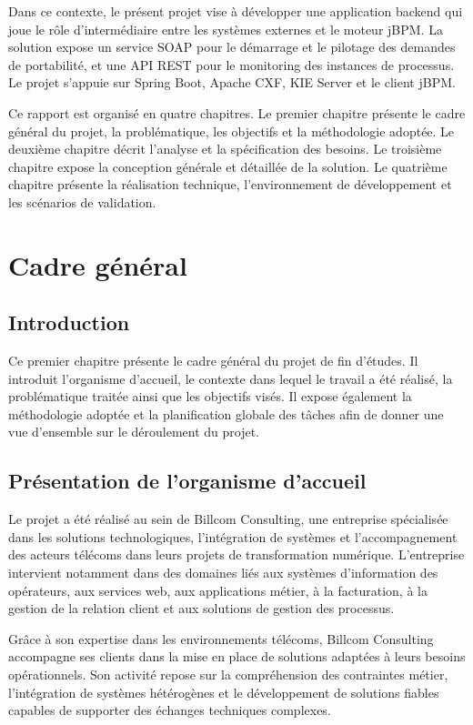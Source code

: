 \documentclass[12pt,a4paper]{report}
\begin{document}
Dans ce contexte, le présent projet vise à développer une application backend qui joue le rôle d'intermédiaire entre les systèmes externes et le moteur jBPM. La solution expose un service SOAP pour le démarrage et le pilotage des demandes de portabilité, et une API REST pour le monitoring des instances de processus. Le projet s'appuie sur Spring Boot, Apache CXF, KIE Server et le client jBPM.

Ce rapport est organisé en quatre chapitres. Le premier chapitre présente le cadre général du projet, la problématique, les objectifs et la méthodologie adoptée. Le deuxième chapitre décrit l'analyse et la spécification des besoins. Le troisième chapitre expose la conception générale et détaillée de la solution. Le quatrième chapitre présente la réalisation technique, l'environnement de développement et les scénarios de validation.

\chapter{Cadre général}
\section*{Introduction}
Ce premier chapitre présente le cadre général du projet de fin d'études. Il introduit l'organisme d'accueil, le contexte dans lequel le travail a été réalisé, la problématique traitée ainsi que les objectifs visés. Il expose également la méthodologie adoptée et la planification globale des tâches afin de donner une vue d'ensemble sur le déroulement du projet.

\section{Présentation de l'organisme d'accueil}
Le projet a été réalisé au sein de Billcom Consulting, une entreprise spécialisée dans les solutions technologiques, l'intégration de systèmes et l'accompagnement des acteurs télécoms dans leurs projets de transformation numérique. L'entreprise intervient notamment dans des domaines liés aux systèmes d'information des opérateurs, aux services web, aux applications métier, à la facturation, à la gestion de la relation client et aux solutions de gestion des processus.

Grâce à son expertise dans les environnements télécoms, Billcom Consulting accompagne ses clients dans la mise en place de solutions adaptées à leurs besoins opérationnels. Son activité repose sur la compréhension des contraintes métier, l'intégration de systèmes hétérogènes et le développement de solutions fiables capables de supporter des échanges techniques complexes.
\end{document}
